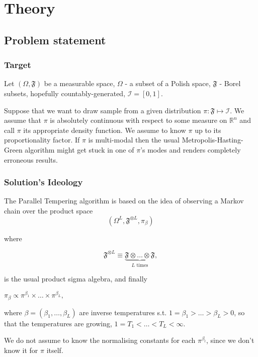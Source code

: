 \chapter{ Theory }	

\section*{Problem statement}

\subsection*{Target}
Let $(\Omega, \mathfrak{F})$ be a measurable space, $\Omega$ - a subset of a Polish space, $\mathfrak{F}$ - Borel subsets, hopefully countably-generated, $\mathcal{I} = [0,1]$.

Suppose that we want to draw sample from a given distribution $ \pi: \mathfrak{F} \mapsto \mathcal{I}$. We assume that $\pi$ is absolutely continuous with respect to some measure on $\mathbb{R}^n$ and call $\pi$ its appropriate density function. We assume to know $\pi$ up to its proportionality factor. If $\pi$ is multi-modal then the usual Metropolis-Hasting-Green algorithm might get stuck in one of $\pi$'s modes and renders completely erroneous results.


\subsection*{Solution's Ideology} 
The Parallel Tempering algorithm is based on the idea of observing a Markov chain over the product space $$(\Omega^L, \mathfrak{F}^{\otimes L}, \pi_\beta)$$

where 

	$$\mathfrak{F}^{\otimes L} \equiv \underbrace{\mathfrak{F} \otimes \dots \otimes \mathfrak{F}}_{\text{$L$ times}},$$

is the usual product sigma algebra, and finally 

\begin{assumptions}
	\item $\pi_\beta \propto \pi^{\beta_1} \times \dots \times \pi^{\beta_L},$\label{product form}
\end{assumptions}	

where $\beta = (\beta_1 , \dots , \beta_L)$ are inverse temperatures s.t. $1 = \beta_1 > \dots > \beta_L > 0$, so that the temperatures are growing, $1 = T_1 < \dots < T_L < \infty$.

We do not assume to know the normalising constants for each $\pi^{\beta_l}$, since we don't know it for $\pi$ itself.

